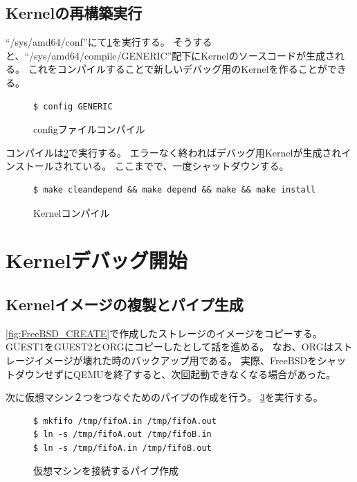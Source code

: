 \documentclass[a4j]{jarticle}
\begin{document}
\begin{multicols}{2}
\subsection{Kernelの再構築実行}
\label{sec:Kern_build}
``/sys/amd64/conf''にて\ref{fig:FreeBSD_cf}を実行する。
そうすると、``/sys/amd64/compile/GENERIC''配下にKernelのソースコードが生成される。
これをコンパイルすることで新しいデバッグ用のKernelを作ることができる。
\begin{figure}[htbp]
	\begin{center}
		\begin{lstlisting}[basicstyle=\ttfamily\footnotesize, frame=single, breaklines=true]
$ config GENERIC
		\end{lstlisting}
	\end{center}
	\caption{configファイルコンパイル}
	\label{fig:FreeBSD_cf}
\end{figure}

コンパイルは\ref{fig:FreeBSD_kern}で実行する。
エラーなく終わればデバッグ用Kernelが生成されインストールされている。
ここまでで、一度シャットダウンする。
\begin{figure}[htbp]
	\begin{center}
		\begin{lstlisting}[basicstyle=\ttfamily\footnotesize, frame=single, breaklines=true]
$ make cleandepend && make depend && make && make install
		\end{lstlisting}
	\end{center}
	\caption{Kernelコンパイル}
	\label{fig:FreeBSD_kern}
\end{figure}

\section{Kernelデバッグ開始}
\subsection{Kernelイメージの複製とパイプ生成}
\ref{fig:FreeBSD_CREATE}で作成したストレージのイメージをコピーする。
GUEST1をGUEST2とORGにコピーしたとして話を進める。
なお、ORGはストレージイメージが壊れた時のバックアップ用である。
実際、FreeBSDをシャットダウンせずにQEMUを終了すると、次回起動できなくなる場合があった。

次に仮想マシン２つをつなぐためのパイプの作成を行う。
\ref{fig:FreeBSD_pipe}を実行する。
\begin{figure}[htbp]
	\begin{center}
		\begin{lstlisting}[basicstyle=\ttfamily\footnotesize, frame=single, breaklines=true]
$ mkfifo /tmp/fifoA.in /tmp/fifoA.out
$ ln -s /tmp/fifoA.out /tmp/fifoB.in
$ ln -s /tmp/fifoA.in /tmp/fifoB.out
		\end{lstlisting}
	\end{center}
	\caption{仮想マシンを接続するパイプ作成}
	\label{fig:FreeBSD_pipe}
\end{figure}


\end{multicols}
\end{document}
